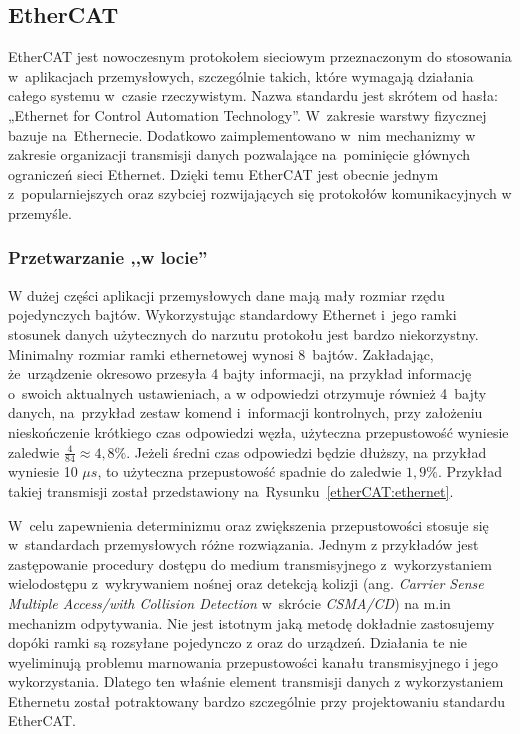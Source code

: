 \subsection{EtherCAT}

EtherCAT jest nowoczesnym protokołem sieciowym przeznaczonym do stosowania w~aplikacjach przemysłowych, szczególnie takich, które wymagają działania całego systemu w~czasie rzeczywistym. Nazwa standardu jest skrótem od hasła: „Ethernet for Control Automation Technology”. W~zakresie warstwy fizycznej bazuje na~Ethernecie. Dodatkowo zaimplementowano w~nim mechanizmy w zakresie organizacji transmisji danych pozwalające na~pominięcie głównych ograniczeń sieci Ethernet. Dzięki temu EtherCAT jest obecnie jednym z~popularniejszych oraz szybciej rozwijających się protokołów komunikacyjnych w przemyśle.

\subsubsection{Przetwarzanie ,,w locie''}
W dużej części aplikacji przemysłowych dane mają mały rozmiar rzędu pojedynczych bajtów. Wykorzystując standardowy Ethernet i~jego ramki stosunek danych użytecznych do narzutu protokołu jest bardzo niekorzystny. 
Minimalny rozmiar ramki ethernetowej wynosi 8~bajtów. Zakładając, że~urządzenie okresowo przesyła 4 bajty informacji, na przykład informację o~swoich aktualnych ustawieniach, a w odpowiedzi otrzymuje również 4~bajty danych, na~przykład zestaw komend i~informacji kontrolnych, przy założeniu nieskończenie krótkiego czas odpowiedzi węzła, użyteczna przepustowość wyniesie zaledwie $\frac{4}{84}\approx4,8\%$. Jeżeli średni czas odpowiedzi będzie dłuższy, na przykład wyniesie 10 $\mu s$, to użyteczna przepustowość spadnie do zaledwie $1,9\%$. Przykład takiej transmisji został przedstawiony na~Rysunku~\ref{etherCAT:ethernet}.


W~celu zapewnienia determinizmu oraz zwiększenia przepustowości stosuje się w~standardach przemysłowych różne rozwiązania. Jednym z przykładów jest zastępowanie procedury dostępu do medium transmisyjnego z~wykorzystaniem wielodostępu z~wykrywaniem nośnej oraz detekcją kolizji (ang. \textit{Carrier Sense Multiple Access/with Collision Detection} w~skrócie \textit{CSMA/CD}) na m.in mechanizm odpytywania.
Nie jest istotnym jaką metodę dokładnie zastosujemy dopóki ramki są rozsyłane pojedynczo z oraz do urządzeń. Działania te nie wyeliminują problemu marnowania przepustowości kanału transmisyjnego i jego wykorzystania. Dlatego ten właśnie element transmisji danych z wykorzystaniem Ethernetu został potraktowany bardzo szczególnie przy projektowaniu standardu EtherCAT.

